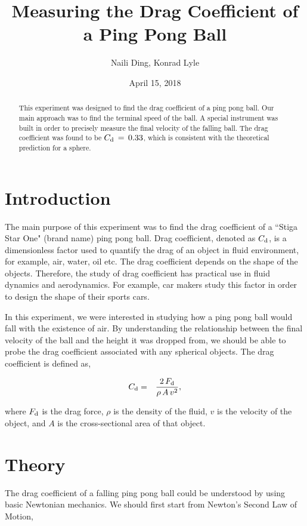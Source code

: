 \documentclass{article}
\begin{document}
\title{Measuring the Drag Coefficient of a Ping Pong Ball}
\author{Naili Ding, Konrad Lyle}
\date{April 15, 2018}
\maketitle

\begin{abstract}
This experiment was designed to find the drag coefficient of a ping pong ball. Our main approach was to find the terminal speed of the ball. A special instrument was built in order to precisely measure the final velocity of the falling ball. The drag coefficient was found to be $C_{\textnormal{d}}\,=\,0.33$, which is consistent with the theoretical prediction for a sphere. 
\end{abstract}

\section{Introduction}

\noindent The main purpose of this experiment was to find the drag coefficient of a ``Stiga Star One" (brand name) ping pong ball. Drag coefficient, denoted as $C_{\textnormal{d}}$, is a dimensionless factor used to quantify the drag of an object in fluid environment, for example, air, water, oil etc. The drag coefficient depends on the shape of the objects. Therefore, the study of drag coefficient has practical use in fluid dynamics and aerodynamics. For example, car makers study this factor in order to design the shape of their sports cars.

\noindent In this experiment, we were interested in studying how a ping pong ball would fall with the existence of air. By understanding the relationship between the final velocity of the ball and the height it was dropped from, we should be able to probe the drag coefficient associated with any spherical objects. The drag coefficient is defined as,

\begin{eqnarray}
C_{\textnormal{d}}&=&\frac{2\,F_{\textnormal{d}}}{\rho\,A\,v^{2}},
\label{eqn:ddef}
\end{eqnarray}

\noindent where $F_{\textnormal{d}}$ is the drag force, $\rho$ is the density of the fluid, $v$  is the velocity of the object, and $A$ is the cross-sectional area of that object.

\section{Theory}
The drag coefficient of a falling ping pong ball could be understood by using basic Newtonian mechanics. We should first start from Newton's Second Law of Motion, 
\end{document}
